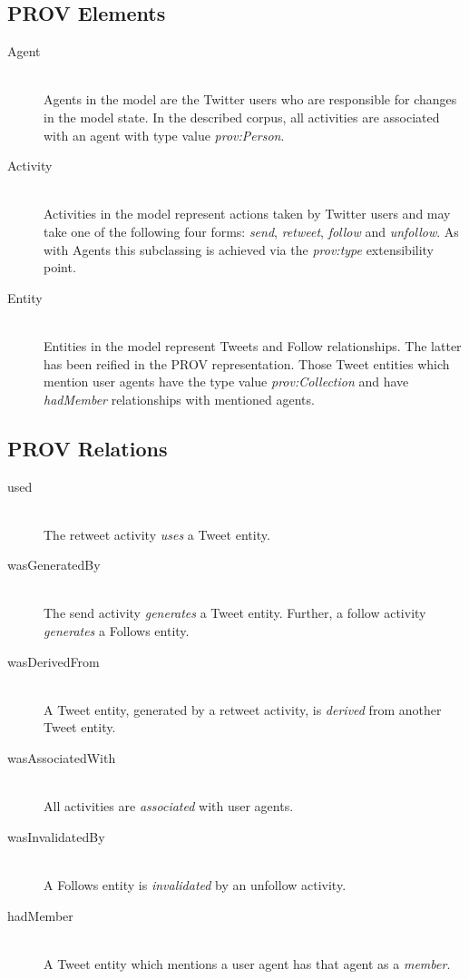 \documentclass{llncs}
\begin{document}
\subsection{PROV Elements}
%
\begin{description}
  \item[Agent] \hfill \\
  Agents in the model are the Twitter users who are responsible for changes in the model state. In the described corpus, all activities are associated with an agent with type value \textit{prov:Person}.
  \item[Activity] \hfill \\
  Activities in the model represent actions taken by Twitter users and may take one of the following four forms: \textit{send}, \textit{retweet}, \textit{follow} and \textit{unfollow}. As with Agents this subclassing is achieved via the \textit{prov:type} extensibility point.
  \item[Entity] \hfill \\
  Entities in the model represent Tweets and Follow relationships. The latter has been reified in the PROV representation. Those Tweet entities which mention user agents have the type value \textit{prov:Collection} and have \textit{hadMember} relationships with mentioned agents.
\end{description}
%
\subsection{PROV Relations}
%
\begin{description}
  \item[used] \hfill \\
  The retweet activity \textit{uses} a Tweet entity.
  \item[wasGeneratedBy] \hfill \\
  The send activity \textit{generates} a Tweet entity. Further, a follow activity \textit{generates} a Follows entity.
  \item[wasDerivedFrom] \hfill \\
  A Tweet entity, generated by a retweet activity, is \textit{derived} from another Tweet entity.
  \item[wasAssociatedWith] \hfill \\
  All activities are \textit{associated} with user agents.
  \item[wasInvalidatedBy] \hfill \\
  A Follows entity is \textit{invalidated} by an unfollow activity. 
  \item[hadMember] \hfill \\
  A Tweet entity which mentions a user agent has that agent as a \textit{member}.
\end{description}
%
\end{document}
